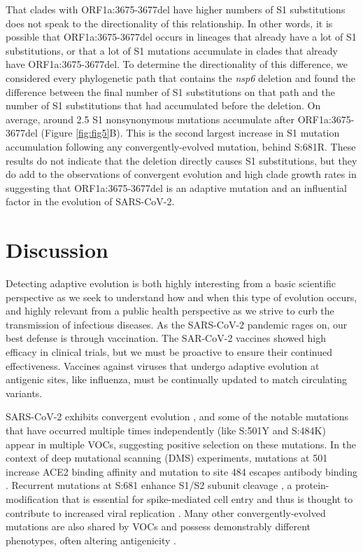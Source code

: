 \documentclass[11pt,oneside,letterpaper]{article}
\begin{document}
That clades with ORF1a:3675-3677del have higher numbers of S1 substitutions does not speak to the directionality of this relationship. In other words, it is possible that ORF1a:3675-3677del occurs in lineages that already have a lot of S1 substitutions, or that a lot of S1 mutations accumulate in clades that already have ORF1a:3675-3677del. To determine the directionality of this difference, we considered every phylogenetic path that contains the \emph{nsp6} deletion and found the difference between the final number of S1 substitutions on that path and the number of S1 substitutions that had accumulated before the deletion. On average, around 2.5 S1 nonsynonymous mutations accumulate after ORF1a:3675-3677del (Figure \ref{fig:fig5}B). This is the second largest increase in S1 mutation accumulation following any convergently-evolved mutation, behind S:681R. These results do not indicate that the deletion directly causes S1 substitutions, but they do add to the observations of convergent evolution and high clade growth rates in suggesting that ORF1a:3675-3677del is an adaptive mutation and an influential factor in the evolution of SARS-CoV-2.



\section*{Discussion}
Detecting adaptive evolution is both highly interesting from a basic scientific perspective as we seek to understand how and when this type of evolution occurs, and highly relevant from a public health perspective as we strive to curb the transmission of infectious diseases. As the SARS-CoV-2 pandemic rages on, our best defense is through vaccination. The SAR-CoV-2 vaccines showed high efficacy in clinical trials, but we must be proactive to ensure their continued effectiveness. Vaccines against viruses that undergo adaptive evolution at antigenic sites, like influenza, must be continually updated to match circulating variants.

SARS-CoV-2 exhibits convergent evolution \cite{Van_Dorp2020-ox, Martin2021-lj, Rochman2021-sv}, and some of the notable mutations that have occurred multiple times independently (like S:501Y and S:484K) appear in multiple VOCs, suggesting positive selection on these mutations. In the context of deep mutational scanning (DMS) experiments, mutations at 501 increase ACE2 binding affinity \cite{Starr2020-bt} and mutation to site 484 escapes antibody binding \cite{Greaney2021-jn}. Recurrent mutations at S:681 enhance S1/S2 subunit cleavage \cite{Lubinski2021-ul, Liu2021-ne}, a protein-modification that is essential for spike-mediated cell entry \cite{Hoffmann2020-vi} and thus is thought to contribute to increased viral replication \cite{Liu2021-ne}. Many other convergently-evolved mutations are also shared by VOCs and possess demonstrably different phenotypes, often altering antigenicity \cite{Li2020-jd, McCarthy2021-lg, Wang2021-dm}.
\end{document}
